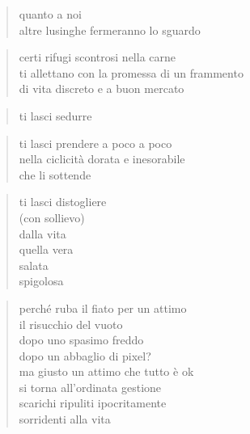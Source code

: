 	\begin{verse}
                quanto a noi\\
                altre lusinghe fermeranno lo sguardo
	\end{verse}

\clearpage


\vspace*{2cm}

	\begin{verse}
                certi rifugi scontrosi nella carne\\
                ti allettano con la promessa di un frammento\\
                di vita discreto e a buon mercato
	\end{verse}

	\begin{verse}
                ti lasci sedurre
	\end{verse}

	\begin{verse}
                ti lasci prendere a poco a poco\\
                nella ciclicità dorata e inesorabile\\
                che li sottende
	\end{verse}

	\begin{verse}
                ti lasci distogliere\\
                (con sollievo)\\
                dalla vita\\
                quella vera\\
                salata\\
                spigolosa
	\end{verse}

\clearpage


\vspace*{2cm}

	\begin{verse}
		perché ruba il fiato per un attimo\\
		il risucchio del vuoto\\
		dopo uno spasimo freddo\\
		dopo un abbaglio di pixel?\\
		ma giusto un attimo che tutto è ok\\
		si torna all'ordinata gestione\\
		scarichi ripuliti ipocritamente\\
		sorridenti alla vita
	\end{verse}

